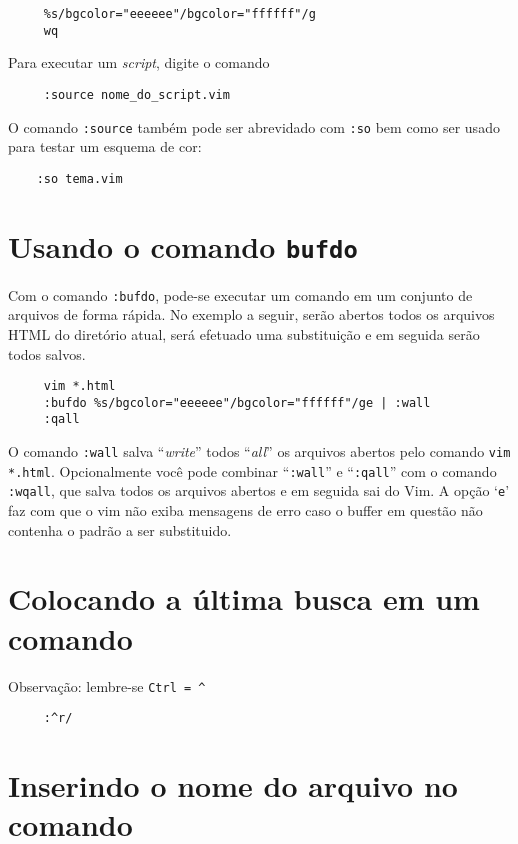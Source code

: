 \begin{verbatim}
     %s/bgcolor="eeeeee"/bgcolor="ffffff"/g
     wq
\end{verbatim}

Para executar um {\em script}, digite o comando

\begin{verbatim}
     :source nome_do_script.vim
\end{verbatim}

O comando {\tt :source} também pode ser abrevidado com {\tt :so}
bem como ser usado para testar um esquema de cor:

\begin{verbatim}
    :so tema.vim
\end{verbatim}

\section{Usando o comando {\tt bufdo}}\label{Usando o comando bufdo}

Com o comando {\tt :bufdo}, pode-se executar um comando em um
conjunto de arquivos de forma rápida. No exemplo a seguir, serão abertos
todos os arquivos HTML do diretório atual, será efetuado uma substituição
e em seguida serão todos salvos.

\begin{verbatim}
     vim *.html
     :bufdo %s/bgcolor="eeeeee"/bgcolor="ffffff"/ge | :wall
     :qall
\end{verbatim}

O comando {\tt :wall} salva ``{\em write}'' todos ``{\em all}'' os arquivos
abertos pelo comando {\tt vim *.html}. Opcionalmente você pode
combinar ``{\tt :wall}'' e ``{\tt :qall}'' com o comando {\tt :wqall}, que
salva todos os arquivos abertos e em seguida sai do Vim. A opção `{\tt e}' 
faz com que o vim não exiba mensagens de erro caso o buffer em questão não 
contenha o padrão a ser substituido.

\section{Colocando a última busca em um comando }
Observação: lembre-se \verb|Ctrl = ^|

\begin{verbatim}
     :^r/
\end{verbatim}

\section{Inserindo o nome do arquivo no comando }

